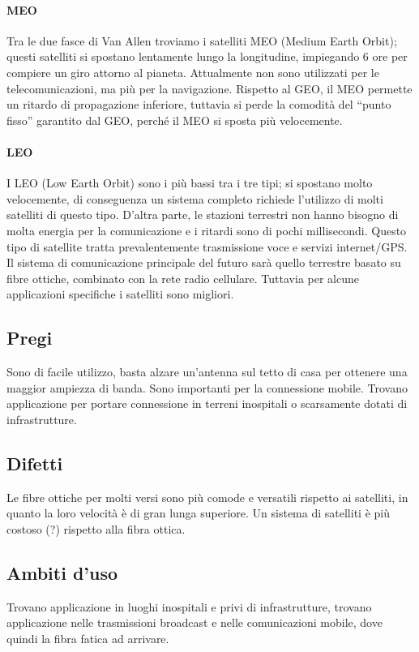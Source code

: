 \paragraph{MEO}
Tra le due fasce di Van Allen troviamo i satelliti MEO (Medium Earth Orbit); questi satelliti si spostano lentamente lungo la longitudine,
impiegando 6 ore per compiere un giro attorno al pianeta. Attualmente non sono utilizzati per le telecomunicazioni, ma più per la navigazione.
Rispetto al GEO, il MEO permette un ritardo di propagazione inferiore, tuttavia si perde la comodità del “punto fisso” garantito dal GEO, perché il MEO si sposta più velocemente.

\paragraph{LEO}
I LEO (Low Earth Orbit) sono i più bassi tra i tre tipi; si spostano molto velocemente, di conseguenza un sistema completo richiede l’utilizzo di molti satelliti di questo tipo.
D’altra parte, le stazioni terrestri non hanno bisogno di molta energia per la comunicazione e i ritardi sono di pochi millisecondi.
Questo tipo di satellite tratta prevalentemente trasmissione voce e servizi internet/GPS. \\

Il sistema di comunicazione principale del futuro sarà quello terrestre basato su fibre ottiche, combinato con la rete radio cellulare.
Tuttavia per alcune applicazioni specifiche i satelliti sono migliori.

\subsection{Pregi}
Sono di facile utilizzo, basta alzare un'antenna sul tetto di casa per ottenere una maggior ampiezza di banda.
Sono importanti per la connessione mobile.
Trovano applicazione per portare connessione in terreni inospitali o scarsamente dotati di infrastrutture.

\subsection{Difetti}
Le fibre ottiche per molti versi sono più comode e versatili rispetto ai satelliti, in quanto la loro velocità è di gran lunga superiore.
Un sistema di satelliti è più costoso (?) rispetto alla fibra ottica.

\subsection{Ambiti d'uso}
Trovano applicazione in luoghi inospitali e privi di infrastrutture, trovano applicazione nelle trasmissioni broadcast e nelle comunicazioni mobile, dove quindi la fibra fatica ad arrivare.

